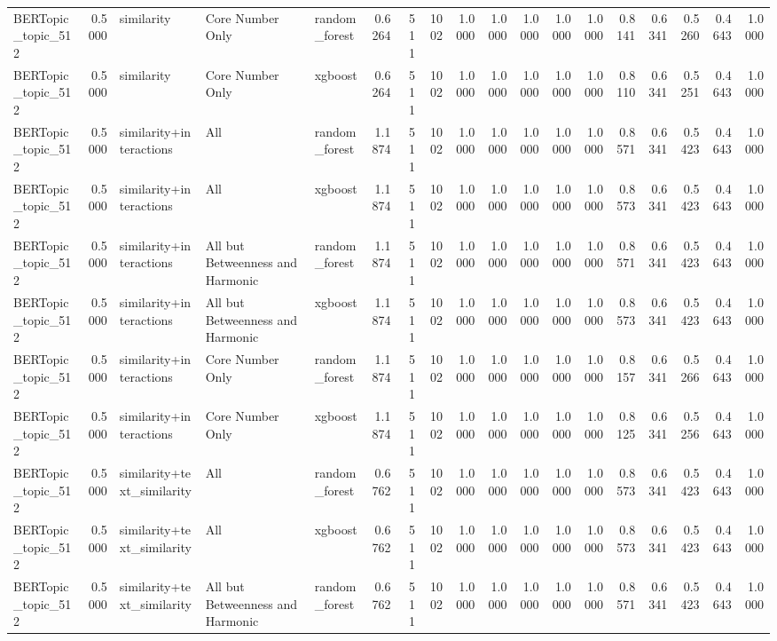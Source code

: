 \begin{tabular}{lrlllrrrrrrrrrrrrr}
BERTopic_topic_512 & 0.5000 & similarity & Core Number Only & random_forest & 0.6264 & 511 & 1002 & 1.0000 & 1.0000 & 1.0000 & 1.0000 & 1.0000 & 0.8141 & 0.6341 & 0.5260 & 0.4643 & 1.0000 \\
BERTopic_topic_512 & 0.5000 & similarity & Core Number Only & xgboost & 0.6264 & 511 & 1002 & 1.0000 & 1.0000 & 1.0000 & 1.0000 & 1.0000 & 0.8110 & 0.6341 & 0.5251 & 0.4643 & 1.0000 \\
BERTopic_topic_512 & 0.5000 & similarity+interactions & All & random_forest & 1.1874 & 511 & 1002 & 1.0000 & 1.0000 & 1.0000 & 1.0000 & 1.0000 & 0.8571 & 0.6341 & 0.5423 & 0.4643 & 1.0000 \\
BERTopic_topic_512 & 0.5000 & similarity+interactions & All & xgboost & 1.1874 & 511 & 1002 & 1.0000 & 1.0000 & 1.0000 & 1.0000 & 1.0000 & 0.8573 & 0.6341 & 0.5423 & 0.4643 & 1.0000 \\
BERTopic_topic_512 & 0.5000 & similarity+interactions & All but Betweenness and Harmonic & random_forest & 1.1874 & 511 & 1002 & 1.0000 & 1.0000 & 1.0000 & 1.0000 & 1.0000 & 0.8571 & 0.6341 & 0.5423 & 0.4643 & 1.0000 \\
BERTopic_topic_512 & 0.5000 & similarity+interactions & All but Betweenness and Harmonic & xgboost & 1.1874 & 511 & 1002 & 1.0000 & 1.0000 & 1.0000 & 1.0000 & 1.0000 & 0.8573 & 0.6341 & 0.5423 & 0.4643 & 1.0000 \\
BERTopic_topic_512 & 0.5000 & similarity+interactions & Core Number Only & random_forest & 1.1874 & 511 & 1002 & 1.0000 & 1.0000 & 1.0000 & 1.0000 & 1.0000 & 0.8157 & 0.6341 & 0.5266 & 0.4643 & 1.0000 \\
BERTopic_topic_512 & 0.5000 & similarity+interactions & Core Number Only & xgboost & 1.1874 & 511 & 1002 & 1.0000 & 1.0000 & 1.0000 & 1.0000 & 1.0000 & 0.8125 & 0.6341 & 0.5256 & 0.4643 & 1.0000 \\
BERTopic_topic_512 & 0.5000 & similarity+text_similarity & All & random_forest & 0.6762 & 511 & 1002 & 1.0000 & 1.0000 & 1.0000 & 1.0000 & 1.0000 & 0.8573 & 0.6341 & 0.5423 & 0.4643 & 1.0000 \\
BERTopic_topic_512 & 0.5000 & similarity+text_similarity & All & xgboost & 0.6762 & 511 & 1002 & 1.0000 & 1.0000 & 1.0000 & 1.0000 & 1.0000 & 0.8573 & 0.6341 & 0.5423 & 0.4643 & 1.0000 \\
BERTopic_topic_512 & 0.5000 & similarity+text_similarity & All but Betweenness and Harmonic & random_forest & 0.6762 & 511 & 1002 & 1.0000 & 1.0000 & 1.0000 & 1.0000 & 1.0000 & 0.8571 & 0.6341 & 0.5423 & 0.4643 & 1.0000 \\

\end{tabular}
